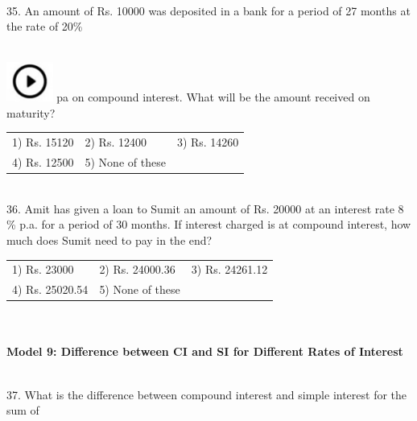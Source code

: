 \documentclass{article}
\begin{document}
	\noindent \\  35. An amount of Rs. 10000 was deposited in a bank for a period of 27 months at the rate of 20\%
	
	\noindent  
\noindent \\ \includegraphics*[width=0.60in, height=0.52in]{images/image1} pa on compound interest. What will be the amount received on maturity?
	
	\noindent \begin{tabular}{p{1.7in} p{1.6in} p{1.6in}} \\ 
 1) Rs. 15120               &  2) Rs. 12400        &  3) Rs. 14260        \\
4) Rs. 12500        & 5) None of these  \\
\end{tabular}
	
	\noindent 
	
	\noindent 
	
	\noindent 
	
	\noindent \\  36. Amit has given a loan to Sumit an amount of Rs. 20000 at an interest rate 8 \% p.a. for a period of 30 months. If interest charged is at compound interest, how much does Sumit need to pay in the end?
	
	\noindent \begin{tabular}{p{1.7in} p{1.6in} p{1.6in}} \\ 
 1) Rs. 23000               &  2) Rs. 24000.36   &  3) Rs. 24261.12   \\
4) Rs. 25020.54   & 5) None of these  \\
\end{tabular}
	
	\noindent 
	
	\noindent 
	
	\noindent 
	
	\noindent  \\ 
	
	\noindent  \\ \textbf{Model 9: Difference between CI and SI for Different Rates of Interest}
	
	\noindent 
	
	\noindent 
	
	\noindent  \\ 37. What is the difference between compound interest and simple interest for the sum of
	
\end{document}
